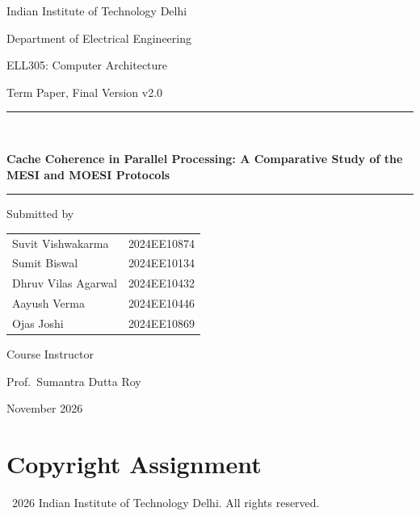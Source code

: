 \documentclass[11pt,a4paper,oneside]{report}
\newcommand{\paperTitle}{Cache Coherence in Parallel Processing:
  A Comparative Study of the MESI and MOESI Protocols}
\newcommand{\memberOne}{Suvit Vishwakarma}
\newcommand{\memberOneEntry}{2024EE10874}
\newcommand{\memberTwo}{Sumit Biswal}
\newcommand{\memberTwoEntry}{2024EE10134}
\newcommand{\memberThree}{Dhruv Vilas Agarwal}
\newcommand{\memberThreeEntry}{2024EE10432}
\newcommand{\memberFour}{Aayush Verma}
\newcommand{\memberFourEntry}{2024EE10446}
\newcommand{\memberFive}{Ojas Joshi}
\newcommand{\memberFiveEntry}{2024EE10869}
\newcommand{\instructorName}{Prof.\ Sumantra Dutta Roy}
\newcommand{\courseCode}{ELL305}
\newcommand{\courseName}{Computer Architecture}
\newcommand{\institute}{Indian Institute of Technology Delhi}
\newcommand{\department}{Department of Electrical Engineering}
\newcommand{\paperVersion}{Final Version v2.0}
\begin{document}
\begin{titlepage}
\centering
\vspace*{1.2cm}
{\sffamily\large \institute\par}
{\sffamily \department\par}
\vspace{1.4cm}
{\sffamily\large \courseCode: \courseName\par}
{\sffamily Term Paper, \paperVersion\par}
\vspace{1.8cm}
\rule{\textwidth}{1.1pt}\\[0.7cm]
{\sffamily\bfseries\Large \paperTitle\par}
\vspace{0.7cm}
\rule{\textwidth}{1.1pt}
\vspace{1.8cm}

{\sffamily\large Submitted by\par}
\vspace{0.6cm}
{\renewcommand{\arraystretch}{1.35}
\begin{tabular}{@{}ll@{}}
\sffamily \memberOne   & \sffamily \memberOneEntry   \\
\sffamily \memberTwo   & \sffamily \memberTwoEntry   \\
\sffamily \memberThree & \sffamily \memberThreeEntry \\
\sffamily \memberFour  & \sffamily \memberFourEntry  \\
\sffamily \memberFive  & \sffamily \memberFiveEntry  \\
\end{tabular}}

\vspace{1.8cm}
{\sffamily\large Course Instructor\par}
\vspace{0.3cm}
{\sffamily\large \instructorName\par}
\vfill
{\sffamily November 2026\par}
\end{titlepage}

\setcounter{page}{2}
\chapter*{Copyright Assignment}

\noindent\textcopyright~2026 Indian Institute of Technology Delhi. All rights
reserved.
\end{document}
